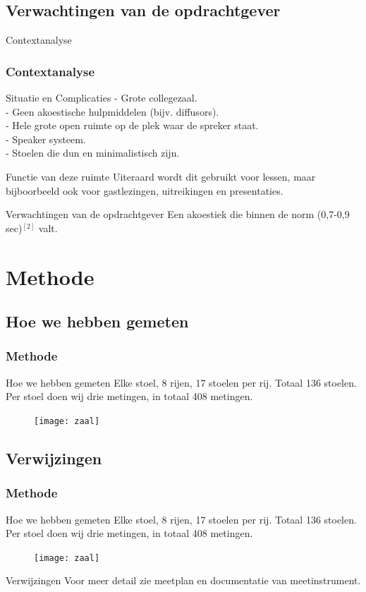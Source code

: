 \documentclass{beamer}
\begin{document}
\subsection{Verwachtingen van de opdrachtgever}
\begin{frame}{Contextanalyse}
\frametitle{Contextanalyse}
\begin{block}{Situatie en Complicaties}
  - Grote collegezaal.\\
  - Geen akoestische hulpmiddelen (bijv. diffusors).\\
  - Hele grote open ruimte op de plek waar de spreker staat.\\
  - Speaker systeem.\\
  - Stoelen die dun en minimalistisch zijn.
\end{block}
\begin{block}{Functie van deze ruimte}
  Uiteraard wordt dit gebruikt voor lessen, maar bijboorbeeld ook voor gastlezingen, uitreikingen en presentaties.
\end{block}
\begin{block}{Verwachtingen van de opdrachtgever}
  Een akoestiek die binnen de norm (0,7-0,9 sec)$^{[2]}$ valt. 
\end{block}
\end{frame}



\section{Methode}
\subsection{Hoe we hebben gemeten}
\begin{frame}
  \frametitle{Methode}
\begin{block}{Hoe we hebben gemeten}
  Elke stoel, 8 rijen, 17 stoelen per rij. Totaal 136 stoelen. Per stoel doen wij drie metingen, in totaal 408 metingen.
\end{block}
\begin{figure}
  \texttt{[image: zaal]}
\end{figure}
\end{frame}

\subsection{Verwijzingen}
\begin{frame}
  \frametitle{Methode}
\begin{block}{Hoe we hebben gemeten}
  Elke stoel, 8 rijen, 17 stoelen per rij. Totaal 136 stoelen. Per stoel doen wij drie metingen, in totaal 408 metingen.
\end{block}
\begin{figure}
  \texttt{[image: zaal]}
\end{figure}
\begin{block}{Verwijzingen}
  Voor meer detail zie meetplan en documentatie van meetinstrument.
\end{block}
\end{frame}
\end{document}
